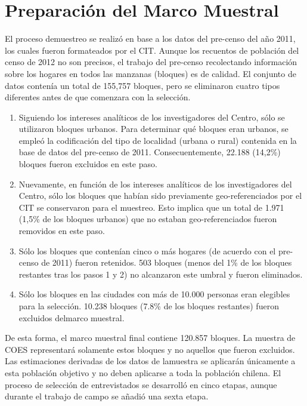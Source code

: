 \documentclass[
]{book}
\begin{document}
\hypertarget{preparaciuxf3n-del-marco-muestral}{%
\section{Preparación del Marco
Muestral}\label{preparaciuxf3n-del-marco-muestral}}

El proceso demuestreo se realizó en base a los datos del pre-censo del
año 2011, los cuales fueron formateados por el CIT. Aunque los recuentos
de población del censo de 2012 no son precisos, el trabajo del pre-censo
recolectando información sobre los hogares en todos las manzanas
(bloques) es de calidad. El conjunto de datos contenía un total de
155,757 bloques, pero se eliminaron cuatro tipos diferentes antes de que
comenzara con la selección.

\begin{enumerate}
\def\labelenumi{\arabic{enumi}.}
\item
  Siguiendo los intereses analíticos de los investigadores del Centro,
  sólo se utilizaron bloques urbanos. Para determinar qué bloques eran
  urbanos, se empleó la codificación del tipo de localidad (urbana o
  rural) contenida en la base de datos del pre-censo de 2011.
  Consecuentemente, 22.188 (14,2\%) bloques fueron excluidos en este
  paso.
\item
  Nuevamente, en función de los intereses analíticos de los
  investigadores del Centro, sólo los bloques que habían sido
  previamente geo-referenciados por el CIT se conservaron para el
  muestreo. Esto implica que un total de 1.971 (1,5\% de los bloques
  urbanos) que no estaban geo-referenciados fueron removidos en este
  paso.
\item
  Sólo los bloques que contenían cinco o más hogares (de acuerdo con el
  pre-censo de 2011) fueron retenidos. 503 bloques (menos del 1\% de los
  bloques restantes tras los pasos 1 y 2) no alcanzaron este umbral y
  fueron eliminados.
\item
  Sólo los bloques en las ciudades con más de 10.000 personas eran
  elegibles para la selección. 10.238 bloques (7.8\% de los bloques
  restantes) fueron excluidos delmarco muestral.
\end{enumerate}

De esta forma, el marco muestral final contiene 120.857 bloques. La
muestra de COES representará solamente estos bloques y no aquellos que
fueron excluidos. Las estimaciones derivadas de los datos de lamuestra
se aplicarán únicamente a esta población objetivo y no deben aplicarse a
toda la población chilena. El proceso de selección de entrevistados se
desarrolló en cinco etapas, aunque durante el trabajo de campo se añadió
una sexta etapa.
\end{document}
